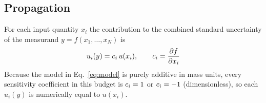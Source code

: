 \subsection{Propagation}
For each input quantity $x_i$ the contribution to the combined standard
uncertainty of the measurand $y = f(x_1,\ldots,x_N)$ is
\begin{equation}
  u_i(y) = c_i \, u(x_i), \qquad
  c_i = \frac{\partial f}{\partial x_i}
\end{equation}
Because the model in Eq.~\eqref{eq:model} is purely additive in mass units,
every sensitivity coefficient in this budget is $c_i = 1$ or $c_i = -1$
(dimensionless), so each $u_i(y)$ is numerically equal to $u(x_i)$.
